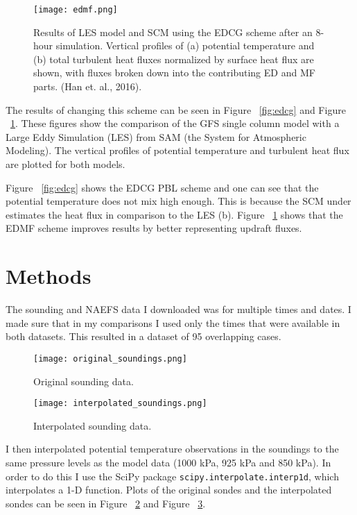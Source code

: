 \documentclass[12pt]{article}
\begin{document}
\begin{figure}[h]
    \centering
    \texttt{[image: edmf.png]}
    \caption{Results of LES model and SCM using the EDCG scheme after an 8-hour simulation. 
    Vertical profiles of (a) potential temperature and (b) total turbulent heat fluxes 
    normalized by surface heat flux are shown, with fluxes broken down into the 
    contributing ED and MF parts. (Han et. al., 2016).}
    \label{fig:edmf}
\end{figure}


The results of changing this scheme can be seen in Figure ~\ref{fig:edcg} and Figure ~\ref{fig:edmf}. 
These figures show the comparison of the GFS single column model with a Large Eddy Simulation (LES) 
from SAM (the System for Atmospheric Modeling). The vertical profiles of potential temperature and 
turbulent heat flux are plotted for both models. 

Figure ~\ref{fig:edcg} shows the EDCG PBL scheme and one can see that the potential temperature 
does not mix high enough. This is because the SCM under estimates the heat flux in comparison to 
the LES (b). Figure ~\ref{fig:edmf} shows that the EDMF scheme improves results by better 
representing updraft fluxes.  



\section{Methods}

The sounding and NAEFS data I downloaded was for multiple times and dates. I made sure that 
in my comparisons I used only the times that were available in both datasets. This resulted 
in a dataset of 95 overlapping cases. 

\begin{figure}[h]
    \centering
    \texttt{[image: original\_soundings.png]}
    \caption{Original sounding data.}
    \label{fig:orig_snds}
\end{figure}

\begin{figure}[h]
    \centering
    \texttt{[image: interpolated\_soundings.png]}
    \caption{Interpolated sounding data.}
    \label{fig:interp_snds}
\end{figure}



I then interpolated potential temperature observations in the soundings to the same pressure 
levels as the model data (1000 kPa, 925 kPa and 850 kPa). In order to do this I use the SciPy 
package \lstinline{scipy.interpolate.interp1d}, which interpolates a 1-D function. Plots of 
the original sondes and the interpolated sondes can be seen in Figure ~\ref{fig:orig_snds} and 
Figure ~\ref{fig:interp_snds}.
\end{document}
